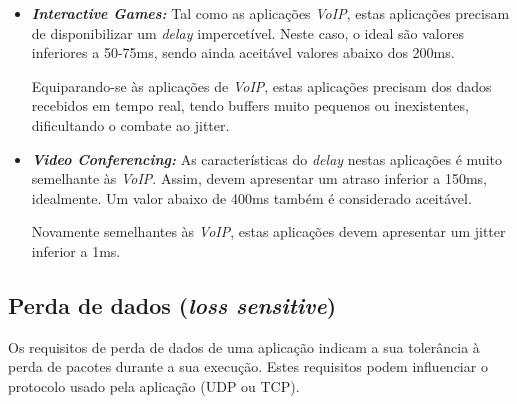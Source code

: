 \documentclass[a4paper, 11pt]{article}
\begin{document}
\begin{itemize}
    \item \textit{\textbf{Interactive Games:}} Tal como as aplicações \textit{VoIP}, estas aplicações precisam de disponibilizar um \textit{delay} impercetível. Neste caso, o ideal são valores inferiores a 50-75ms, sendo ainda aceitável valores abaixo dos 200ms.
    
    Equiparando-se às aplicações de \textit{VoIP}, estas aplicações precisam dos dados recebidos em tempo real, tendo buffers muito pequenos ou inexistentes, dificultando o combate ao jitter.
    
    \item \textit{\textbf{Video Conferencing:}} As características do \textit{delay} nestas aplicações é muito semelhante às \textit{VoIP}. Assim, devem apresentar um atraso inferior a 150ms, idealmente. Um valor abaixo de 400ms também é considerado aceitável.
    
    Novamente semelhantes às \textit{VoIP}, estas aplicações devem apresentar um jitter inferior a 1ms.
\end{itemize}

\subsection{Perda de dados (\textit{loss sensitive}) \cite{etsi_tr}}

Os requisitos de perda de dados de uma aplicação indicam a sua tolerância à perda de pacotes durante a sua execução. Estes requisitos podem influenciar o protocolo usado pela aplicação (UDP ou TCP).
\end{document}
